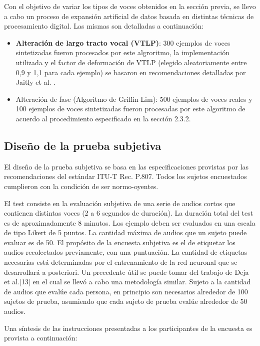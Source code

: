 Con el objetivo de variar los tipos de voces obtenidos en la sección previa, se llevo a cabo un proceso de expansión artificial de datos basada en distintas técnicas de procesamiento digital. Las mismas son detalladas a continuación:
\begin{itemize}
    \item \textbf{Alteración de largo tracto vocal (VTLP)}: 300 ejemplos de voces sintetizadas fueron procesados por este algroritmo, la implementación utilizada y el factor de deformación de VTLP (elegido aleatoriamente entre 0,9 y 1,1 para cada ejemplo) se basaron en recomendaciones detalladas por Jaitly et al. \cite{vtlp}.
            
    \item Alteración de fase (Algoritmo de Griffin-Lim): 500 ejemplos de voces reales y 100 ejemplos de voces sintetizadas fueron procesadas por este algoritmo de acuerdo al procedimiento especificado en la sección 2.3.2. 
    
\end{itemize}{}

\subsection{Diseño de la prueba subjetiva}

El diseño de la prueba subjetiva se basa en las especificaciones provistas por las recomendaciones del estándar ITU-T Rec. P.807. Todos los sujetos encuestados cumplieron con la condición de ser normo-oyentes.

El test consiste en la evaluación subjetiva de una serie de audios cortos que contienen distintas voces (2 a 6 segundos de duración). La duración total del test es de aproximadamente 8 minutos. Los ejemplo deben ser evaluados en una escala de tipo Likert de 5 puntos. La cantidad máxima de audios que un sujeto puede evaluar es de 50. El propósito de la encuesta subjetiva es el de etiquetar los audios recolectados previamente, con una puntuación. La cantidad de etiquetas necesarias está determinadas por el entrenamiento de la red neuronal que se desarrollará a posteriori. Un precedente útil se puede tomar del trabajo de Deja et al.[13] en el cual se llevó a cabo una metodología similar. Sujeto a la cantidad de audios que evalúe cada persona, en principio son necesarios alrededor de 100 sujetos de prueba, asumiendo que cada sujeto de prueba evalúe alrededor de 50 audios.

Una síntesis de las instrucciones presentadas a los participantes de la encuesta es provista a continuación:

